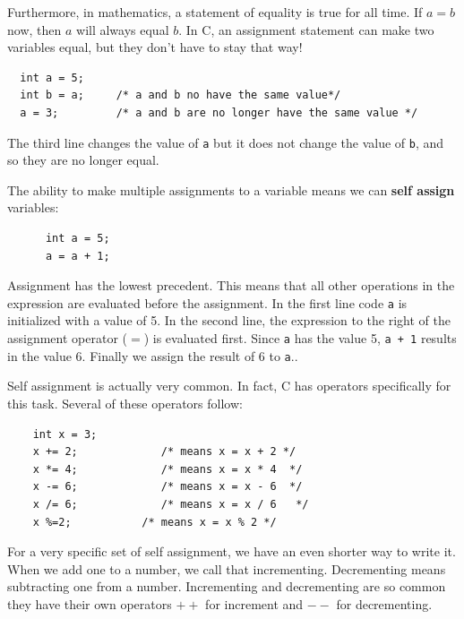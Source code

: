 Furthermore, in mathematics, a statement of equality is true
for all time.  If $a = b$ now, then $a$ will always equal $b$.
In C, an assignment statement can make two variables equal,
but they don't have to stay that way!

\begin{verbatim}
  int a = 5;
  int b = a;     /* a and b no have the same value*/
  a = 3;         /* a and b are no longer have the same value */
\end{verbatim}
%
The third line changes the value of {\tt a} but it does not
change the value of {\tt b}, and so they are no longer equal.

The ability to make multiple assignments to a variable means we can {\bf self assign} variables:

\begin{verbatim}
	  int a = 5;  
	  a = a + 1;       
\end{verbatim}
%
Assignment has the lowest precedent. 
This means that all other operations in the expression are evaluated before the assignment. 
In the first line code {\tt a} is initialized with a value of 5. In the second line, 
the expression  to the right of the assignment operator ($=$) is evaluated first. 
Since {\tt a} has the value 5, {\tt a + 1}  results in the value 6.
Finally we assign the result of 6 to {\tt a}..


Self assignment is actually very common. In fact, C has operators specifically for this task.
Several of these operators follow:

 \begin{verbatim}
 	int x = 3;
 	x += 2;				/* means x = x + 2 */      
 	x *= 4;				/* means x = x * 4  */      
 	x -= 6;				/* means x = x - 6  */      
 	x /= 6;				/* means x = x / 6   */    
 	x %=2;			 /* means x = x % 2 */  
 \end{verbatim}
For a very specific set of self assignment, we have an even shorter way to write it. 
When we add one to a number, we call that incrementing. 
Decrementing means subtracting one from a number.
Incrementing and decrementing are so common they have 
their own operators $++$ for increment and $--$ for decrementing.

